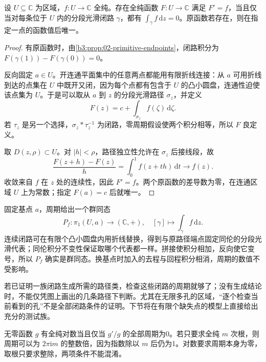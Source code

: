\begin{theorem}[原函数的周期判别]\label{b3:thm:10-primitive-periods}
设 \(U\subseteq\mathbb C\) 为区域，\(f:U\to\mathbb C\) 全纯。存在全纯函数 \(F:U\to\mathbb C\) 满足 \(F'=f\)，当且仅当对每条位于 \(U\) 内的分段光滑闭路 \(\gamma\)，都有 \(\int_\gamma f\,\mathrm{d}z=0\)。原函数若存在，则在指定一点的函数值后唯一。
\end{theorem}
\begin{proof}
有原函数时，由\cref{b3:prop:02-primitive-endpoints}，闭路积分为 \(F(\gamma(1))-F(\gamma(0))=0\)。

反向固定 \(a\in U\)。开连通平面集中的任意两点都能用有限折线连接：从 \(a\) 可用折线到达的点集在 \(U\) 中既开又闭，因为每个点都有包含于 \(U\) 的凸小圆盘，连通性迫使该点集为 \(U\)。于是可以取从 \(a\) 到 \(z\) 的分段光滑路径 \(\sigma_z\)，并定义
\[
 F(z)=c+\int_{\sigma_z}f(\zeta)\,\mathrm{d}\zeta.
\]
若 \(\tau_z\) 是另一个选择，\(\sigma_z*\tau_z^{-1}\) 为闭路，零周期假设使两个积分相等，所以 \(F\) 良定义。

取 \(D(z,\rho)\subset U\)。对 \(|h|<\rho\)，路径独立性允许在 \(\sigma_z\) 后接线段，故
\[
 \frac{F(z+h)-F(z)}h
 =\int_0^1 f(z+th)\,\mathrm{d}t
 \longrightarrow f(z).
\]
收敛来自 \(f\) 在 \(z\) 处的连续性，因此 \(F'=f\)。两个原函数的差导数为零，在连通区域 \(U\) 上为常数；指定 \(F(a)=c\) 后就唯一。
\end{proof}
固定基点 \(a\)，周期给出一个群同态
\[
 P_f:\pi_1(U,a)\longrightarrow(\mathbb C,+),
 \quad [\gamma]\longmapsto\int_\gamma f\,\mathrm{d}z.
\]
连续闭路可在有限个凸小圆盘内用折线替换，得到与原路径端点固定同伦的分段光滑代表；同伦积分不变性保证取哪个代表都一样。拼接使积分相加，反向使它变号，所以 \(P_f\) 确实是群同态。换基点时加入的去程与回程积分相消，周期的数值不受影响。

\ProseParagraphBreak
若已证明一族闭路生成所需的路径类，检查这些闭路的周期就够了；没有生成结论时，不能仅凭图上画出的几条路径下判断。尤其在无限多孔的区域，“逐个检查当前看到的孔”不是全部闭路条件的证明。下节将在有限个缺失点的模型上直接给出充分的测试族。

\ProseParagraphBreak
无零函数 \(g\) 有全纯对数当且仅当 \(g'/g\) 的全部周期为0。若只要求全纯 \(m\) 次根，则周期可以为 \(2\pi\mathrm{i}m\) 的整数倍，因为指数除以 \(m\) 后仍为1。对数要求周期本身为零，取根只要求整除，两项条件不能混淆。


